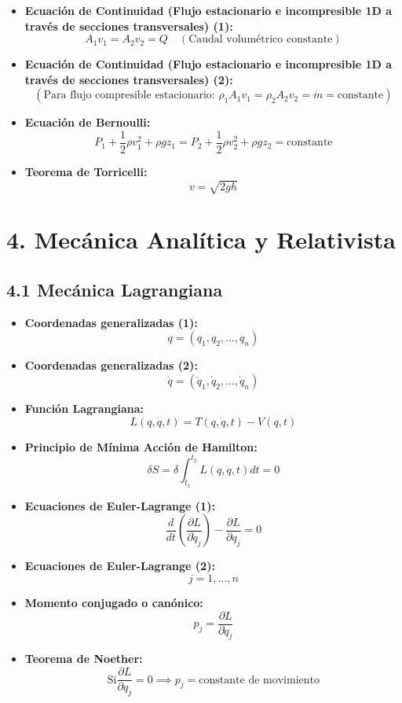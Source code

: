 \documentclass[11pt,a4paper]{article}
\begin{document}
\begin{itemize}
  \item \textbf{Ecuación de Continuidad (Flujo estacionario e incompresible 1D a través de secciones transversales) (1):}
  \[
    A_1 v_1 = A_2 v_2 = Q \quad (\text{Caudal volumétrico constante})
  \]
  \item \textbf{Ecuación de Continuidad (Flujo estacionario e incompresible 1D a través de secciones transversales) (2):}
  \[
    \left( \text{Para flujo compresible estacionario: } \rho_1 A_1 v_1 = \rho_2 A_2 v_2 = \dot{m} = \text{constante} \right)
  \]
  \item \textbf{Ecuación de Bernoulli:}
  \[
    P_1 + \frac{1}{2}\rho v_1^2 + \rho g z_1 = P_2 + \frac{1}{2}\rho v_2^2 + \rho g z_2 = \text{constante}
  \]
  \item \textbf{Teorema de Torricelli:}
  \[
    v = \sqrt{2gh}
  \]
\end{itemize}

\section*{4. Mecánica Analítica y Relativista}

\subsection*{4.1 Mecánica Lagrangiana}

\begin{itemize}
  \item \textbf{Coordenadas generalizadas (1):}
  \[
    q = (q_1, q_2, \dots, q_n)
  \]
  \item \textbf{Coordenadas generalizadas (2):}
  \[
    \dot{q} = (\dot{q}_1, \dot{q}_2, \dots, \dot{q}_n)
  \]
  \item \textbf{Función Lagrangiana:}
  \[
    L(q, \dot{q}, t) = T(q, \dot{q}, t) - V(q, t)
  \]
  \item \textbf{Principio de Mínima Acción de Hamilton:}
  \[
    \delta S = \delta \int_{t_1}^{t_2} L(q, \dot{q}, t) dt = 0
  \]
  \item \textbf{Ecuaciones de Euler-Lagrange (1):}
  \[
    \frac{d}{dt}\left( \frac{\partial L}{\partial \dot{q}_j} \right) - \frac{\partial L}{\partial q_j} = 0
  \]
  \item \textbf{Ecuaciones de Euler-Lagrange (2):}
  \[
    j = 1, \dots, n
  \]
  \item \textbf{Momento conjugado o canónico:}
  \[
    p_j = \frac{\partial L}{\partial \dot{q}_j}
  \]
  \item \textbf{Teorema de Noether:}
  \[
    \mathrm{Si } \frac{\partial L}{\partial q_j} = 0 \implies p_j = \text{constante de movimiento}
  \]
\end{itemize}
\end{document}
